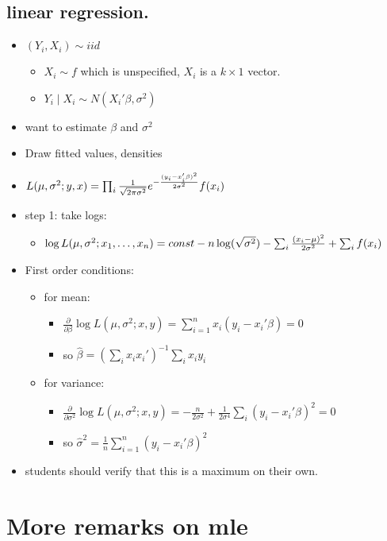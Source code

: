 \subsection{linear regression.}
\begin{itemize}
\item $(Y_i,X_i) \sim iid$
\begin{itemize}
\item $X_i \sim f$ which is unspecified, $X_i$ is a $k\times1$ vector.
\item $Y_i \mid X_i \sim N(X_i'\beta, \sigma^2)$
\end{itemize}
\item want to estimate $\beta$ and $\sigma^2$
\item Draw fitted values, densities
\item $L(\mu,\sigma^2; y, x) = \prod_i {1 \over \sqrt{2 \pi \sigma^2}} e^{- {(y_i - x_i'\beta)^2 \over 2 \sigma^2}} f(x_i)$
\item step 1: take logs:
\begin{itemize}
\item $\log L(\mu,\sigma^2; x_1,\dots,x_n) = const - n\log
         (\sqrt{\sigma^2}) - \sum_i {(x_i - \mu)^2 \over 2 \sigma^2} + \sum_i f(x_i)$
\end{itemize}
\item First order conditions:
\begin{itemize}
\item for mean:
\begin{itemize}
\item $\frac{\partial}{\partial \beta} \log L(\mu, \sigma^2; x, y) = \sum_{i=1}^n x_i (y_i - x_i'\beta) = 0$
\item so $\hat\beta=(\sum_i x_i x_i')^{-1} \sum_i x_i y_i$
\end{itemize}
\item for variance:
\begin{itemize}
\item $\frac{\partial}{\partial \sigma^2} \log L(\mu, \sigma^2; x, y) = -\frac{n}{2\sigma^2} + \frac{1}{2 \sigma^4}\sum_i (y_i - x_i'\beta)^2 = 0$
\item so $\hat\sigma^2 = \frac{1}{n} \sum_{i=1}^n (y_i - x_i'\beta)^2$
\end{itemize}
\end{itemize}
\item students should verify that this is a maximum on their own.
\end{itemize}

\section{More remarks on mle}


